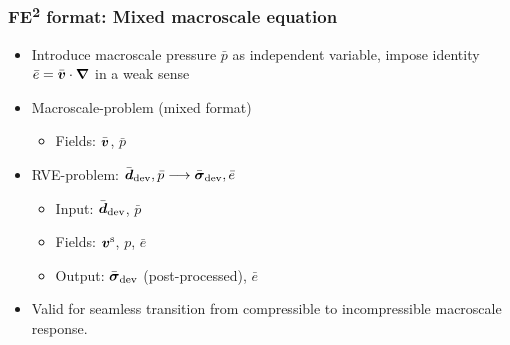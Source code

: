 \documentclass[11pt]{beamer} %
\begin{document}
\begin{frame}
 \frametitle{FE\textsuperscript{2} format: Mixed macroscale equation}
 \begin{itemize}
  \item Introduce macroscale pressure $\bar{p}$ as independent variable, impose identity $\bar{e} = \bar{\boldsymbol{v}}\cdot \boldsymbol{\nabla}$ in a weak sense
 \end{itemize}

 \begin{itemize}
  \item Macroscale-problem (mixed format)
  \begin{itemize}
   \item Fields: $\bar{\boldsymbol{v}}$, $\bar{p}$%
  \end{itemize}
  \item RVE-problem: $\bar{\boldsymbol{d}}_{\mathrm{dev}}, \bar{p} \longrightarrow \bar{\boldsymbol{\sigma}}_{\mathrm{dev}}, \bar{e}$
  \begin{itemize}
   \item Input: $\bar{\boldsymbol{d}}_{\mathrm{dev}}$, $\bar{p}$
   \item Fields: $\boldsymbol{v}^{\mathrm{s}}$, $p$, $\bar{e}$%
   \item Output: $\bar{\boldsymbol{\sigma}}_{\mathrm{dev}}$ (post-processed), $\bar{e}$
  \end{itemize}
 \end{itemize}

 \begin{itemize}
  \item Valid for seamless transition from compressible to incompressible macroscale response.
 \end{itemize}
\end{frame}
\end{document}
